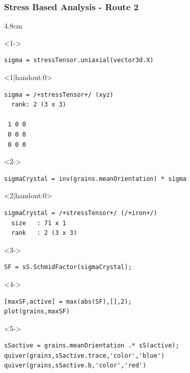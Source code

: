 \documentclass[compress,aspectratio=1610,fleqn]{beamer}
\begin{document}
\begin{frame}[fragile]
  \frametitle{Stress Based Analysis - Route 2}
  \vspace{-0.5cm}
  \begin{overlayarea}{\textwidth}{4.8cm}
    \begin{onlyenv}<1->
\begin{lstlisting}[style=input]
sigma = stressTensor.uniaxial(vector3d.X)
\end{lstlisting}
  \end{onlyenv}
  \begin{onlyenv}<1|handout:0>
    \vspace{-0.35cm}
\begin{lstlisting}[style=output]
sigma = /+stressTensor+/ (xyz)
  rank: 2 (3 x 3)

 1 0 0
 0 0 0
 0 0 0
\end{lstlisting}
    \end{onlyenv}
    \vspace{-0.35cm}
    \begin{onlyenv}<2->
\begin{lstlisting}[style=input]
sigmaCrystal = inv(grains.meanOrientation) * sigma
\end{lstlisting}
    \end{onlyenv}
    \begin{onlyenv}<2|handout:0>
      \vspace{-0.35cm}
\begin{lstlisting}[style=output]
sigmaCrystal = /+stressTensor+/ (/+iron+/)
  size   : 71 x 1
  rank   : 2 (3 x 3)
\end{lstlisting}
    \end{onlyenv}
    \begin{onlyenv}<3->
      \vspace{-0.35cm}
      \begin{lstlisting}[style=input]
SF = sS.SchmidFactor(sigmaCrystal);
\end{lstlisting}
    \end{onlyenv}
    \begin{onlyenv}<4->
      \vspace{-0.35cm}
      \begin{lstlisting}[style=input]
[maxSF,active] = max(abs(SF),[],2);
plot(grains,maxSF)
\end{lstlisting}
    \end{onlyenv}
    \begin{onlyenv}<5->
      \vspace{-0.35cm}
      \begin{lstlisting}[style=input]
sSactive = grains.meanOrientation .* sS(active);
quiver(grains,sSactive.trace,'color','blue')
quiver(grains,sSactive.b,'color','red')
\end{lstlisting}
\end{onlyenv}
\end{overlayarea}


\end{frame}
\end{document}
